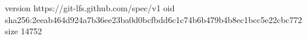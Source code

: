 version https://git-lfs.github.com/spec/v1
oid sha256:2eeab464d924a7b36ee23ba0d0bcfbdd6c1c74b6b479b4b8ec1bcc5e22cbc772
size 14752

